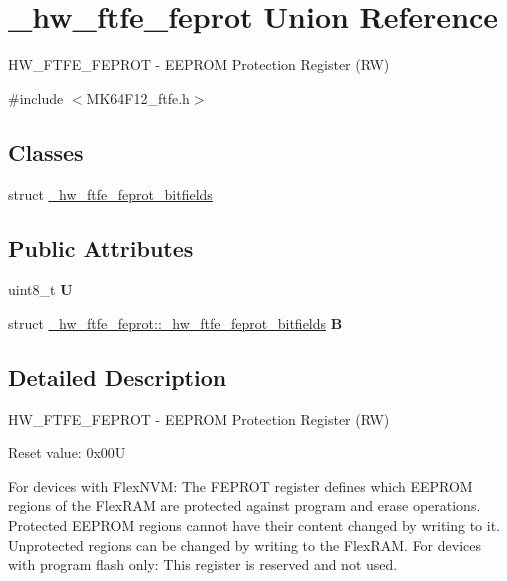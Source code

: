 \hypertarget{union__hw__ftfe__feprot}{}\section{\+\_\+hw\+\_\+ftfe\+\_\+feprot Union Reference}
\label{union__hw__ftfe__feprot}


H\+W\+\_\+\+F\+T\+F\+E\+\_\+\+F\+E\+P\+R\+OT -\/ E\+E\+P\+R\+OM Protection Register (RW)  




{\ttfamily \#include $<$M\+K64\+F12\+\_\+ftfe.\+h$>$}

\subsection*{Classes}
\begin{DoxyCompactItemize}
\item 
struct \hyperlink{struct__hw__ftfe__feprot_1_1__hw__ftfe__feprot__bitfields}{\+\_\+hw\+\_\+ftfe\+\_\+feprot\+\_\+bitfields}
\end{DoxyCompactItemize}
\subsection*{Public Attributes}
\begin{DoxyCompactItemize}
\item 
uint8\+\_\+t {\bfseries U}\hypertarget{union__hw__ftfe__feprot_a5e9d3042aafbbafe81e97cedbec95a9b}{}\label{union__hw__ftfe__feprot_a5e9d3042aafbbafe81e97cedbec95a9b}

\item 
struct \hyperlink{struct__hw__ftfe__feprot_1_1__hw__ftfe__feprot__bitfields}{\+\_\+hw\+\_\+ftfe\+\_\+feprot\+::\+\_\+hw\+\_\+ftfe\+\_\+feprot\+\_\+bitfields} {\bfseries B}\hypertarget{union__hw__ftfe__feprot_ac6750ffda89f06165507945815f6a787}{}\label{union__hw__ftfe__feprot_ac6750ffda89f06165507945815f6a787}

\end{DoxyCompactItemize}


\subsection{Detailed Description}
H\+W\+\_\+\+F\+T\+F\+E\+\_\+\+F\+E\+P\+R\+OT -\/ E\+E\+P\+R\+OM Protection Register (RW) 

Reset value\+: 0x00U

For devices with Flex\+N\+VM\+: The F\+E\+P\+R\+OT register defines which E\+E\+P\+R\+OM regions of the Flex\+R\+AM are protected against program and erase operations. Protected E\+E\+P\+R\+OM regions cannot have their content changed by writing to it. Unprotected regions can be changed by writing to the Flex\+R\+AM. For devices with program flash only\+: This register is reserved and not used. 


